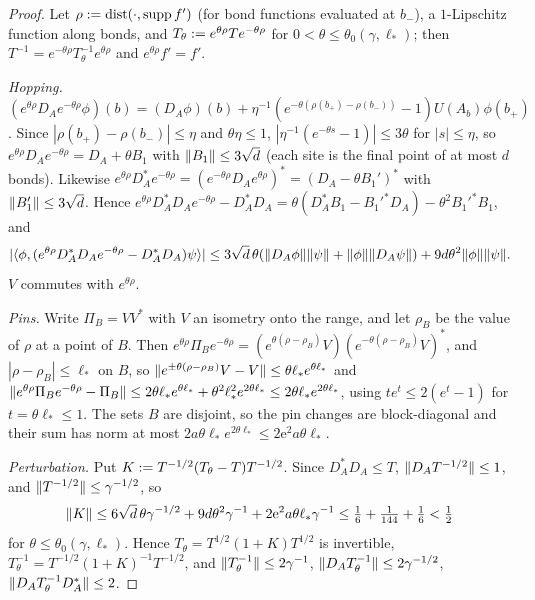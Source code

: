 \begin{proof}
Let $\rho:=\operatorname{dist}(\cdot,\operatorname{supp} f')$ (for bond functions evaluated at $b_-$), a $1$-Lipschitz function along bonds, and $T_\theta:= e^{\theta\rho}Te^{-\theta\rho}$ for $0<\theta\le\theta_0(\gamma,\ell_*)$; then $T^{-1}=e^{-\theta\rho}T_\theta^{-1}e^{\theta\rho}$ and $e^{\theta\rho}f'=f'$.

\emph{Hopping.} $(e^{\theta\rho}D_Ae^{-\theta\rho}\phi)(b)=(D_A\phi)(b)+\eta^{-1}(e^{-\theta(\rho(b_+)-\rho(b_-))}-1)U(A_b)\phi(b_+)$. Since $|\rho(b_+)-\rho(b_-)|\le\eta$ and $\theta\eta\le1$, $|\eta^{-1}(e^{-\theta s}-1)|\le3\theta$ for $|s|\le\eta$, so $e^{\theta\rho}D_Ae^{-\theta\rho}=D_A+\theta B_1$ with $\lVert B_1\rVert\le3\sqrt d$ (each site is the final point of at most $d$ bonds). Likewise $e^{\theta\rho}D_A^*e^{-\theta\rho}=(e^{-\theta\rho}D_Ae^{\theta\rho})^*=(D_A-\theta B_1')^*$ with $\lVert B_1'\rVert\le3\sqrt d$. Hence $e^{\theta\rho}D_A^*D_Ae^{-\theta\rho}-D_A^*D_A=\theta(D_A^*B_1-B_1'^*D_A)-\theta^2B_1'^*B_1$, and
\[
|\langle\phi,(e^{\theta\rho}D_A^*D_Ae^{-\theta\rho}-D_A^*D_A)\psi\rangle|\le3\sqrt d\,\theta(\lVert D_A\phi\rVert\lVert \psi\rVert+\lVert \phi\rVert\lVert D_A\psi\rVert)+9d\theta^2\lVert \phi\rVert\lVert \psi\rVert .
\]
$V$ commutes with $e^{\theta\rho}$.

\emph{Pins.} Write $\Pi_B=VV^*$ with $V$ an isometry onto the range, and let $\rho_B$ be the value of $\rho$ at a point of $B$. Then $e^{\theta\rho}\Pi_Be^{-\theta\rho}=(e^{\theta(\rho-\rho_B)}V)(e^{-\theta(\rho-\rho_B)}V)^*$, and $|\rho-\rho_B|\le\ell_*$ on $B$, so $\lVert e^{\pm\theta(\rho-\rho_B)}V-V\rVert\le\theta\ell_*e^{\theta\ell_*}$ and $\lVert e^{\theta\rho}\Pi_Be^{-\theta\rho}-\Pi_B\rVert\le2\theta\ell_*e^{\theta\ell_*}+\theta^2\ell_*^2e^{2\theta\ell_*}\le2\theta\ell_*e^{2\theta\ell_*}$, using $te^t\le2(e^t-1)$ for $t=\theta\ell_*\le1$. The sets $B$ are disjoint, so the pin changes are block-diagonal and their sum has norm at most $2a\theta\ell_*e^{2\theta\ell_*}\le2\mathrm e^2a\theta\ell_*$.

\emph{Perturbation.} Put $K:= T^{-1/2}(T_\theta-T)T^{-1/2}$. Since $D_A^*D_A\le T$, $\lVert D_AT^{-1/2}\rVert\le1$, and $\lVert T^{-1/2}\rVert\le\gamma^{-1/2}$, so
\[
\lVert K\rVert\le6\sqrt d\,\theta\gamma^{-1/2}+9d\theta^2\gamma^{-1}+2\mathrm e^2a\theta\ell_*\gamma^{-1}\le\tfrac16+\tfrac1{144}+\tfrac16<\tfrac12
\]
for $\theta\le\theta_0(\gamma,\ell_*)$. Hence $T_\theta=T^{1/2}(1+K)T^{1/2}$ is invertible, $T_\theta^{-1}=T^{-1/2}(1+K)^{-1}T^{-1/2}$, and $\lVert T_\theta^{-1}\rVert\le2\gamma^{-1}$, $\lVert D_AT_\theta^{-1}\rVert\le2\gamma^{-1/2}$, $\lVert D_AT_\theta^{-1}D_A^*\rVert\le2$.


\end{proof}
